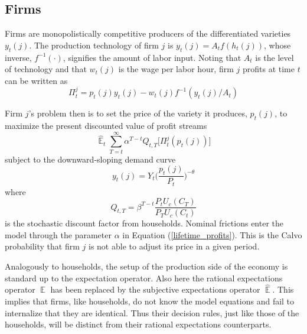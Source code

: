 \documentclass[11pt]{article}
\renewcommand{\[}{\begin{equation}}
\renewcommand{\]}{\end{equation}}
\DeclareMathOperator{\E}{\mathbb{E}}
\begin{document}
\subsection{Firms}

Firms are monopolistically competitive producers of the differentiated varieties $y_t(j)$. The production technology of firm $j$ is $y_t(j)=A_tf(h_t(j))$, whose inverse, $f^{-1}(\cdot)$, signifies the amount of labor input. Noting that $A_t$ is the level of technology and that $w_t(j)$ is the wage per labor hour, firm $j$ profits at time $t$ can be written as
\begin{equation}
\Pi_t^j = p_t(j)y_t(j) -w_t(j)f^{-1}(y_t(j)/A_t)
\end{equation}

Firm $j$'s problem then is to set the price of the variety it produces, $p_t(j)$, to maximize the present discounted value of profit streams
\begin{equation}
\hat{\E}_t\sum^{\infty}_{T=t}\alpha^{T-t} Q_{t,T} \bigg[ \Pi^j_t(p_t(j))\bigg]
\label{lifetime_profits}
\end{equation}
subject to the downward-sloping demand curve
\begin{equation}
y_t(j) = Y_t \bigg(\frac{p_t(j)}{P_t}\bigg)^{-\theta}
\end{equation}
where 
\begin{equation}
Q_{t,T} = \beta^{T-t} \frac{P_t U_c(C_T)}{P_T U_c(C_t)}
\end{equation}
is the stochastic discount factor from households. Nominal frictions enter the model through the parameter $\alpha$ in Equation (\ref{lifetime_profits}). This is the Calvo probability that firm $j$ is not able to adjust its price in a given period. 

Analogously to households, the setup of the production side of the economy is standard up to the expectation operator. Also here the rational expectations operator $\E$ has been replaced by the subjective expectations operator $\hat{\E}$. This implies that firms, like households, do not know the model equations and fail to internalize that they are identical. Thus their decision rules, just like those of the households, will be distinct from their rational expectations counterparts. 
\end{document}
